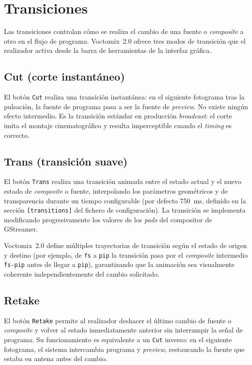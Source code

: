 \section{Transiciones}
\label{sec:transiciones}

Las transiciones controlan cómo se realiza el cambio de una fuente o \textit{composite} a otro
en el flujo de programa. Voctomix~2.0 ofrece tres modos de transición que el realizador
activa desde la barra de herramientas de la interfaz gráfica.

\subsection{Cut (corte instantáneo)}

El botón \texttt{Cut} realiza una transición instantánea: en el siguiente fotograma
tras la pulsación, la fuente de programa pasa a ser la fuente de \textit{preview}. No existe
ningún efecto intermedio. Es la transición estándar en producción \textit{broadcast}: el
corte imita el montaje cinematográfico y resulta imperceptible cuando el
\textit{timing} es correcto.

\subsection{Trans (transición suave)}

El botón \texttt{Trans} realiza una transición animada entre el estado actual y el
nuevo estado de \textit{composite} o fuente, interpolando los parámetros geométricos y de
transparencia durante un tiempo configurable (por defecto 750~ms, definido en la
sección \texttt{[transitions]} del fichero de configuración). La transición se implementa
modificando progresivamente los valores de los \textit{pads} del compositor de GStreamer.

Voctomix~2.0 define múltiples trayectorias de transición según el estado de origen y
destino (por ejemplo, de \texttt{fs} a \texttt{pip} la transición pasa por el \textit{composite}
intermedio \texttt{fs-pip} antes de llegar a \texttt{pip}), garantizando que la
animación sea visualmente coherente independientemente del cambio solicitado.

\subsection{Retake}

El botón \texttt{Retake} permite al realizador deshacer el último cambio de fuente o \textit{composite} y
volver al estado inmediatamente anterior sin interrumpir la señal de programa. Su
funcionamiento es equivalente a un \texttt{Cut} inverso: en el siguiente fotograma, el sistema
intercambia programa y \textit{preview}, restaurando la fuente que estaba en antena antes del
cambio.


